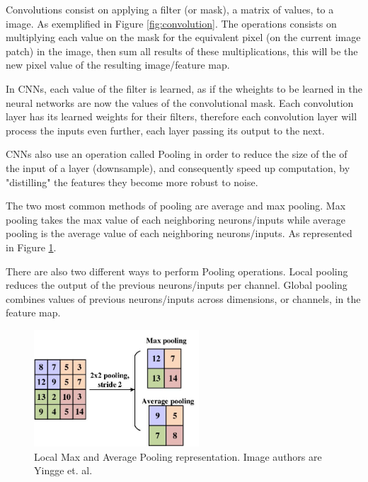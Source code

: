 Convolutions consist on applying a filter (or mask), a matrix of values, to a image. As exemplified in Figure \ref{fig:convolution}. The operations consists on multiplying each value on the mask for the equivalent pixel (on the current image patch) in the image, then sum all results of these multiplications, this will be the new pixel value of the resulting image/feature map.


In CNNs, each value of the filter is learned, as if the wheights to be learned in the neural networks are now the values of the convolutional mask.
Each convolution layer has its learned weights for their filters, therefore each convolution layer will process the inputs even further, each layer passing its output to the next.


CNNs also use an operation called Pooling in order to reduce the size of the of the input of a layer (downsample), and consequently speed up computation, by "distilling" the features they become more robust to noise.

The two most common methods of pooling are average and max pooling. Max pooling takes the max value of each neighboring neurons/inputs while average pooling is the average value of each neighboring neurons/inputs. As represented in Figure \ref{fig:avgmax-pooling}.

There are also two different ways to perform Pooling operations. Local pooling reduces the output of the previous neurons/inputs per channel.
Global pooling combines values of previous neurons/inputs across dimensions, or channels, in the feature map. 

\begin{figure}[!ht]
    \centering
    \includegraphics[width=0.55\textwidth]{img/pooling.jpg}
    \caption{Local Max and Average Pooling representation. Image authors are Yingge et. al.\cite{yingge2020pooling}}
    \label{fig:avgmax-pooling}
\end{figure}

